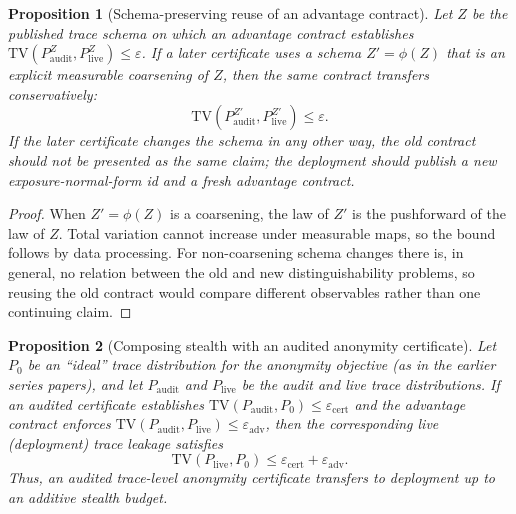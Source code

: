 \documentclass[11pt]{article}
\newtheorem{proposition}{Proposition}
\newcommand{\TV}{\mathrm{TV}}
\begin{document}
\begin{proposition}[Schema-preserving reuse of an advantage contract]\label{prop:reuse_adv}
Let $Z$ be the published trace schema on which an advantage contract establishes $\TV(P_{\mathrm{audit}}^Z,P_{\mathrm{live}}^Z)\le \varepsilon$.
If a later certificate uses a schema $Z' = \phi(Z)$ that is an explicit measurable coarsening of $Z$, then the same contract transfers conservatively:
\[
\TV(P_{\mathrm{audit}}^{Z'},P_{\mathrm{live}}^{Z'}) \le \varepsilon.
\]
If the later certificate changes the schema in any other way, the old contract should not be presented as the same claim; the deployment should publish a new exposure-normal-form id and a fresh advantage contract.
\end{proposition}

\begin{proof}
When $Z'=\phi(Z)$ is a coarsening, the law of $Z'$ is the pushforward of the law of $Z$.
Total variation cannot increase under measurable maps, so the bound follows by data processing.
For non-coarsening schema changes there is, in general, no relation between the old and new distinguishability problems, so reusing the old contract would compare different observables rather than one continuing claim.
\end{proof}

\begin{proposition}[Composing stealth with an audited anonymity certificate]\label{prop:compose}
Let $P_0$ be an ``ideal'' trace distribution for the anonymity objective (as in the earlier series papers), and let $P_{\mathrm{audit}}$ and $P_{\mathrm{live}}$ be the audit and live trace distributions.
If an audited certificate establishes $\TV(P_{\mathrm{audit}},P_0)\le \varepsilon_{\mathrm{cert}}$ and the advantage contract enforces $\TV(P_{\mathrm{audit}},P_{\mathrm{live}})\le \varepsilon_{\mathrm{adv}}$,
then the corresponding live (deployment) trace leakage satisfies
\[
\TV(P_{\mathrm{live}},P_0) \le \varepsilon_{\mathrm{cert}}+\varepsilon_{\mathrm{adv}}.
\]
Thus, an audited trace-level anonymity certificate transfers to deployment up to an additive stealth budget.
\end{proposition}
\end{document}
